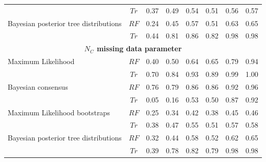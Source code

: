 \begin{landscape}
\begin{table}[!ht]
\begin{tabular}{lccccccc}
                                        & $Tr$ & 0.37 & 0.49 & 0.54 & 0.51 & 0.56 & 0.57 \\ 
  Bayesian posterior tree distributions & $RF$ & 0.24 & 0.45 & 0.57 & 0.51 & 0.63 & 0.65 \\ 
                                        & $Tr$ & 0.44 & 0.81 & 0.86 & 0.82 & 0.98 & 0.98 \\ 
    \hline
  \multicolumn{8}{c}{\textbf{$N_{C}$ missing data parameter}}\\
  \hline
  Maximum Likelihood                    & $RF$ & 0.40 & 0.50 & 0.64 & 0.65 & 0.79 & 0.94 \\ 
                                        & $Tr$ & 0.70 & 0.84 & 0.93 & 0.89 & 0.99 & 1.00 \\ 
  Bayesian consensus                    & $RF$ & 0.76 & 0.79 & 0.86 & 0.86 & 0.92 & 0.96 \\ 
                                        & $Tr$ & 0.05 & 0.16 & 0.53 & 0.50 & 0.87 & 0.92 \\ 
  Maximum Likelihood bootstraps         & $RF$ & 0.25 & 0.34 & 0.42 & 0.38 & 0.45 & 0.46 \\ 
                                        & $Tr$ & 0.38 & 0.47 & 0.55 & 0.51 & 0.57 & 0.58 \\ 
  Bayesian posterior tree distributions & $RF$ & 0.32 & 0.44 & 0.58 & 0.52 & 0.62 & 0.65 \\ 
                                        & $Tr$ & 0.39 & 0.78 & 0.82 & 0.79 & 0.98 & 0.98 \\ 
  \hline
\end{tabular}
\end{table}
\end{landscape}

